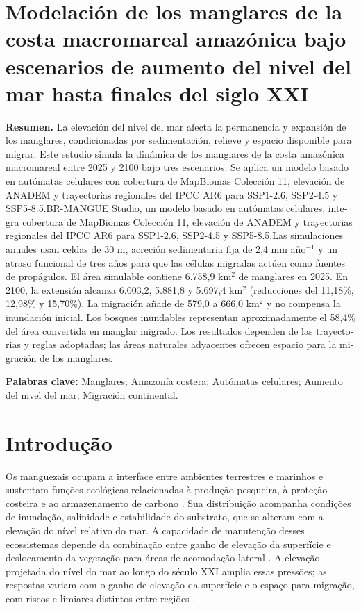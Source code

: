 \documentclass[12pt,a4paper]{article}
\begin{document}
\section*{Modelación de los manglares de la costa macromareal amazónica bajo escenarios de aumento del nivel del mar hasta finales del siglo XXI}
\begin{otherlanguage}{spanish}
\noindent\textbf{Resumen.} La elevación del nivel del mar afecta la permanencia y expansión de los manglares, condicionadas por sedimentación, relieve y espacio disponible para migrar. Este estudio simula la dinámica de los manglares de la costa amazónica macromareal entre 2025 y 2100 bajo tres escenarios. \ifdefined\VersaoCega Se aplica un modelo basado en autómatas celulares con cobertura de MapBiomas Colección 11, elevación de ANADEM y trayectorias regionales del IPCC AR6 para SSP1-2.6, SSP2-4.5 y SSP5-8.5.\else BR-MANGUE Studio, un modelo basado en autómatas celulares, integra cobertura de MapBiomas Colección 11, elevación de ANADEM y trayectorias regionales del IPCC AR6 para SSP1-2.6, SSP2-4.5 y SSP5-8.5.\fi\space Las simulaciones anuales usan celdas de 30 m, acreción sedimentaria fija de 2,4 mm año$^{-1}$ y un atraso funcional de tres años para que las células migradas actúen como fuentes de propágulos. El área simulable contiene 6.758,9 km$^2$ de manglares en 2025. En 2100, la extensión alcanza 6.003,2, 5.881,8 y 5.697,4 km$^2$ (reducciones del 11,18\%, 12,98\% y 15,70\%). La migración añade de 579,0 a 666,0 km$^2$ y no compensa la inundación inicial. Los bosques inundables representan aproximadamente el 58,4\% del área convertida en manglar migrado. Los resultados dependen de las trayectorias y reglas adoptadas; las áreas naturales adyacentes ofrecen espacio para la migración de los manglares.

\noindent\textbf{Palabras clave:} Manglares; Amazonía costera; Autómatas celulares; Aumento del nivel del mar; Migración continental.
\end{otherlanguage}

\section{Introdução}
Os manguezais ocupam a interface entre ambientes terrestres e marinhos e sustentam funções ecológicas relacionadas à produção pesqueira, à proteção costeira e ao armazenamento de carbono \citep{lee2014,kauffman2018}. Sua distribuição acompanha condições de inundação, salinidade e estabilidade do substrato, que se alteram com a elevação do nível relativo do mar. A capacidade de manutenção desses ecossistemas depende da combinação entre ganho de elevação da superfície e deslocamento da vegetação para áreas de acomodação lateral \citep{woodroffe2016}. A elevação projetada do nível do mar ao longo do século XXI amplia essas pressões; as respostas variam com o ganho de elevação da superfície e o espaço para migração, com riscos e limiares distintos entre regiões \citep{fox2021,gilman2008,saintilan2020}.
\end{document}
